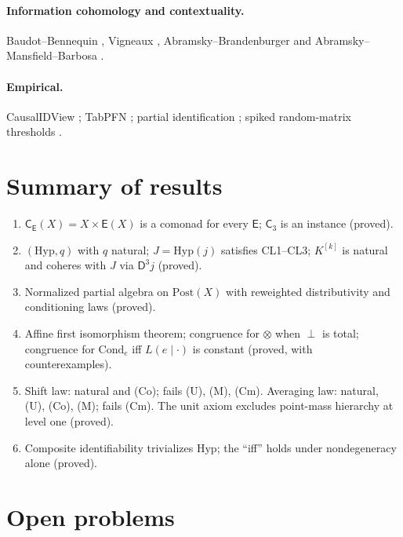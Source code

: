 \documentclass[11pt]{article}
\theoremstyle{definition}
\theoremstyle{remark}
\newcommand{\D}{\mathsf{D}}
\newcommand{\Hyp}{\mathrm{Hyp}}
\newcommand{\Post}{\mathrm{Post}}
\newcommand{\Cond}{\mathrm{Cond}}
\newcommand{\C}{\mathsf{C}}
\newcommand{\E}{\mathsf{E}}
\begin{document}
\paragraph{Information cohomology and contextuality.} Baudot--Bennequin \cite{BaudotBennequin2015},
Vigneaux \cite{Vigneaux2019}, Abramsky--Brandenburger \cite{AbramskyBrandenburger2011} and
Abramsky--Mansfield--Barbosa \cite{AbramskyMansfieldBarbosa2012}.
\paragraph{Empirical.} CausalIDView \cite{Awasthi-CausalIDView}; TabPFN \cite{Hollmann2023}; partial
identification \cite{Manski1990}; spiked random-matrix thresholds \cite{BBP2005}.

\section{Summary of results}

\begin{enumerate}[leftmargin=*]
\item $\C_\E(X)=X\times\E(X)$ is a comonad for every $\E$; $\C_3$ is an instance (proved).
\item $(\Hyp,q)$ with $q$ natural; $J=\Hyp(j)$ satisfies CL1--CL3; $K^{[k]}$ is natural and coheres
  with $J$ via $\D^3j$ (proved).
\item Normalized partial algebra on $\Post(X)$ with reweighted distributivity and conditioning laws
  (proved).
\item Affine first isomorphism theorem; congruence for $\otimes$ when $\perp$ is total; congruence for
  $\Cond_e$ iff $L(e\mid\cdot)$ is constant (proved, with counterexamples).
\item Shift law: natural and (Co); fails (U), (M), (Cm). Averaging law: natural, (U), (Co), (M);
  fails (Cm). The unit axiom excludes point-mass hierarchy at level one (proved).
\item Composite identifiability trivializes $\Hyp$; the ``iff'' holds under nondegeneracy alone (proved).
\end{enumerate}

\section{Open problems}
\end{document}
